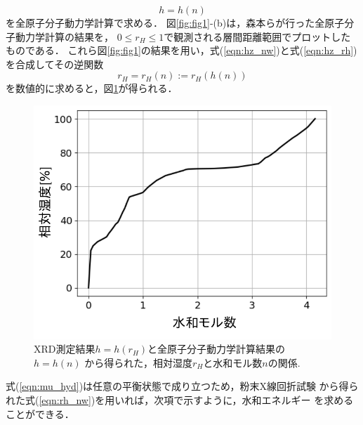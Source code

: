 \begin{equation}
	h=h(n)
	\label{eqn:hz_nw}
\end{equation}
を全原子分子動力学計算で求める．
図\ref{fig:fig1}-(b)は，森本ら\cite{Morimoto}が行った全原子分子動力学計算の結果を，
$0\leq r_H \leq 1$で観測される層間距離範囲でプロットしたものである．
これら図\ref{fig:fig1}の結果を用い，式(\ref{eqn:hz_nw})と式(\ref{eqn:hz_rh})
を合成してその逆関数
\begin{equation}
	r_H=r_H(n):=r_H(h(n))
	\label{eqn:rh_nw}
\end{equation}
を数値的に求めると，図\ref{fig:fig6}が得られる．
\begin{figure}[h]
	\begin{center}
	\includegraphics[width=0.6\linewidth]{Figs/fig6.pdf} 
	\end{center}
	\caption{
		XRD測定結果\(h=h(r_H)\)と全原子分子動力学計算結果の\(h=h(n)\)
		から得られた，相対湿度$r_H$と水和モル数$n$の関係.
	} 
	\label{fig:fig6}
\end{figure}
式(\ref{eqn:mu_hyd})は任意の平衡状態で成り立つため，粉末X線回折試験
から得られた式(\ref{eqn:rh_nw})を用いれば，次項で示すように，水和エネルギー
を求めることができる．
